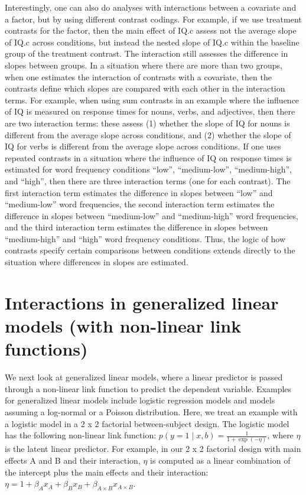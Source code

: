 \documentclass[
  12pt,
]{krantz}
\theoremstyle{definition}
\theoremstyle{definition}
\theoremstyle{definition}
\theoremstyle{definition}
\theoremstyle{remark}
\begin{document}
Interestingly, one can also do analyses with interactions between a covariate and a factor, but by using different contrast codings. For example, if we use treatment contrasts for the factor, then the main effect of IQ.c assess not the average slope of IQ.c across conditions, but instead the nested slope of IQ.c within the baseline group of the treatment contrast. The interaction still assesses the difference in slopes between groups. In a situation where there are more than two groups, when one estimates the interaction of contrasts with a covariate, then the contrasts define which slopes are compared with each other in the interaction terms. For example, when using sum contrasts in an example where the influence of IQ is measured on response times for nouns, verbs, and adjectives, then there are two interaction terms: these assess (1) whether the slope of IQ for nouns is different from the average slope across conditions, and (2) whether the slope of IQ for verbs is different from the average slope across conditions. If one uses repeated contrasts in a situation where the influence of IQ on response times is estimated for word frequency conditions ``low'', ``medium-low'', ``medium-high'', and ``high'', then there are three interaction terms (one for each contrast). The first interaction term estimates the difference in slopes between ``low'' and ``medium-low'' word frequencies, the second interaction term estimates the difference in slopes between ``medium-low'' and ``medium-high'' word frequencies, and the third interaction term estimates the difference in slopes between ``medium-high'' and ``high'' word frequency conditions. Thus, the logic of how contrasts specify certain comparisons between conditions extends directly to the situation where differences in slopes are estimated.

\hypertarget{sec:interactions:NLM}{%
\section{Interactions in generalized linear models (with non-linear link functions)}\label{sec:interactions:NLM}}

We next look at generalized linear models, where a linear predictor is passed through a non-linear link function to predict the dependent variable. Examples for generalized linear models include logistic regression models and models assuming a log-normal or a Poisson distribution. Here, we treat an example with a logistic model in a 2 x 2 factorial between-subject design. The logistic model has the following non-linear link function: \(p(y=1 \mid x, b) = \frac{1}{1 + \exp(-\eta)}\), where \(\eta\) is the latent linear predictor. For example, in our 2 x 2 factorial design with main effects A and B and their interaction, \(\eta\) is computed as a linear combination of the intercept plus the main effects and their interaction: \(\eta = 1 + \beta_A x_A + \beta_B x_B + \beta_{A \times B} x_{A \times B}\).
\end{document}
